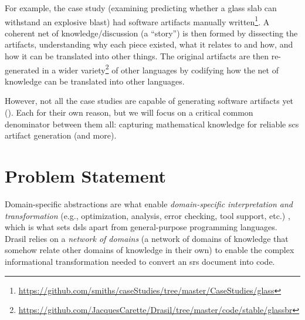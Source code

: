 For example, the  case study (examining predicting whether a glass
slab can withstand an explosive blast) had software artifacts manually
written\footnote{\url{https://github.com/smiths/caseStudies/tree/master/CaseStudies/glass}}.
A coherent net of knowledge/discussion (a ``story'') is then formed by
dissecting the artifacts, understanding why each piece existed, what it relates
to and how, and how it can be translated into other things. The original
artifacts are then re-generated in a wider
variety\footnote{\url{https://github.com/JacquesCarette/Drasil/tree/master/code/stable/glassbr}}
of other languages by codifying how the net of knowledge can be translated into
other languages.

However, not all the case studies are capable of generating software artifacts
yet (). Each for their own reason, but we will focus
on a critical common denominator between them all: capturing mathematical
knowledge for reliable \acs{scs} artifact generation (and more).

\section{Problem Statement}
\label{sec:intro:problemStatement}

\iffalse
      Drasil has de-duplicated knowledge across \acs{scs} artifacts relevant to
      specifications and code. Through codifying knowledge and creating coherent
      ``stories'', Drasil is able to generate a wide variety of software
      artifacts (e.g., \acs{oo} programs via \acs{gool} with guided usage via
      Makefiles, and requirements specifications [HTML and TeX]). This codified
      knowledge was de-duplicated from an originating set of artifacts via
      bottom-up gathering, however, we should be able to use the same knowledge
      to generate more artifacts in different languages, flavours, and with more
      options. However, each desired artifact language has its own way of
      encoding information (such as mathematical expressions). This leaves us
      needing to teach Drasil more about the targeted languages (and, at times,
      about the existing codified knowledge) in order to reliably generate
      usable artifacts.
\fi

Domain-specific abstractions are what enable \textit{domain-specific
interpretation and transformation} (e.g., optimization, analysis, error
checking, tool support, etc.) \cite{Czarnecki2005}, which is what sets
\acsp{dsl} apart from general-purpose programming languages. Drasil relies on a
\textit{network of domains} (a network of domains of knowledge that somehow
relate other domains of knowledge in their own) to enable the complex
informational transformation needed to convert an \acs{srs} document into code.

